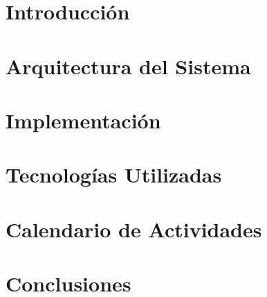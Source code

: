 \documentclass[12pt]{article}
\begin{document}


\newpage

\section*{Introducción}  


\section*{Arquitectura del Sistema}


\section*{Implementación}


\section*{Tecnologías Utilizadas}


\section*{Calendario de Actividades}


\section*{Conclusiones}

\end{document}
